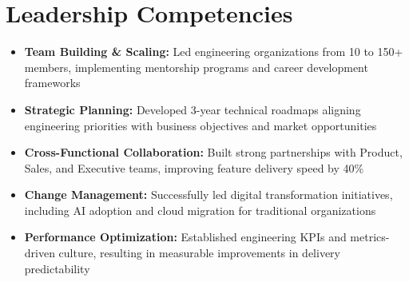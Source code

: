 
\section{Leadership Competencies}
\small{
\begin{itemize}[leftmargin=0in, label={}]
  \item \textbf{Team Building \& Scaling:} Led engineering organizations from 10 to 150+ members, implementing mentorship programs and career development frameworks
  \item \textbf{Strategic Planning:} Developed 3-year technical roadmaps aligning engineering priorities with business objectives and market opportunities
  \item \textbf{Cross-Functional Collaboration:} Built strong partnerships with Product, Sales, and Executive teams, improving feature delivery speed by 40\%
  \item \textbf{Change Management:} Successfully led digital transformation initiatives, including AI adoption and cloud migration for traditional organizations
  \item \textbf{Performance Optimization:} Established engineering KPIs and metrics-driven culture, resulting in measurable improvements in delivery predictability
\end{itemize}
}